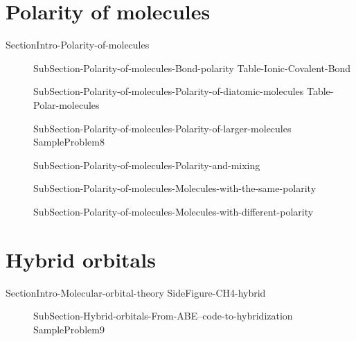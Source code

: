 \documentclass[main.tex]{subfiles}
\newcommand\chapterlabel{Ch-electronicstructure}\setcounter{figurenewcounter}{0}\setcounter{tablenewcounter}{0}\setcounter{formulanewcounter}{0}\chapterpicture{../{\chapterlabel}/figure1}\chapterpicturelabel{PxFuel}
\begin{document}
\section{Polarity of molecules}{SectionIntro-Polarity-of-molecules}
\sloppy \begin{description}
\item[] {SubSection-Polarity-of-molecules-Bond-polarity}
{Table-Ionic-Covalent-Bond}
\item[] {SubSection-Polarity-of-molecules-Polarity-of-diatomic-molecules}
{Table-Polar-molecules}
\item[] {SubSection-Polarity-of-molecules-Polarity-of-larger-molecules}
{SampleProblem8}
\item[] {SubSection-Polarity-of-molecules-Polarity-and-mixing}
\item[] {SubSection-Polarity-of-molecules-Molecules-with-the-same-polarity}
\item[] {SubSection-Polarity-of-molecules-Molecules-with-different-polarity}
\end{description}




\section{Hybrid orbitals}{SectionIntro-Molecular-orbital-theory}
{SideFigure-CH4-hybrid}
\sloppy \begin{description}
\item[] {SubSection-Hybrid-orbitals-From-ABE--code-to-hybridization}
{SampleProblem9}

\end{description}
\end{document}
